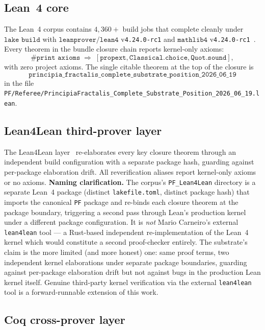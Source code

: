 \documentclass[11pt,a4paper]{amsart}
\theoremstyle{plain}
\theoremstyle{definition}
\begin{document}
\subsection{Lean~4 core}

The Lean~4 corpus contains $4{,}360+$ build jobs that complete cleanly under $\texttt{lake build}$ with $\texttt{leanprover/lean4}$ v\texttt{4.24.0-rc1} and $\texttt{mathlib4}$ v\texttt{4.24.0-rc1}~\cite{moura-ullrich2021,mathlib2020}. Every theorem in the bundle closure chain reports kernel-only axioms:
\[
\texttt{\#print axioms} \;\Longrightarrow\; [\texttt{propext}, \texttt{Classical.choice}, \texttt{Quot.sound}],
\]
with zero project axioms. The single citable theorem at the top of the closure is
\[
\texttt{principia\_fractalis\_complete\_substrate\_position\_2026\_06\_19}
\]
in the file \texttt{PF/Referee/PrincipiaFractalis\_Complete\_Substrate\_Position\_2026\_06\_19.lean}.

\subsection{Lean4Lean third-prover layer}\label{subsec:cross-prover}

The Lean4Lean layer~\cite{carneiro2024} re-elaborates every key closure theorem through an independent build configuration with a separate package hash, guarding against per-package elaboration drift. All reverification aliases report kernel-only axioms or no axioms. \textbf{Naming clarification.} The corpus's \texttt{PF\_Lean4Lean} directory is a separate Lean~4 package (distinct \texttt{lakefile.toml}, distinct package hash) that imports the canonical \texttt{PF} package and re-binds each closure theorem at the package boundary, triggering a second pass through Lean's production kernel under a different package configuration. It is \emph{not} Mario Carneiro's external \texttt{lean4lean} tool --- a Rust-based independent re-implementation of the Lean~4 kernel which would constitute a second proof-checker entirely. The substrate's claim is the more limited (and more honest) one: same proof terms, two independent kernel elaborations under separate package boundaries, guarding against per-package elaboration drift but not against bugs in the production Lean kernel itself. Genuine third-party kernel verification via the external \texttt{lean4lean} tool is a forward-runnable extension of this work.

\subsection{Coq cross-prover layer}
\end{document}
